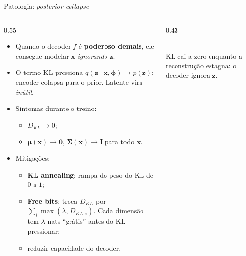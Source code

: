 \documentclass[aspectratio=169,xcolor=dvipsnames]{beamer}
\begin{document}
  \begin{frame}{Patologia: \textit{posterior collapse}}
    \begin{columns}[T]
      \begin{column}{0.55\textwidth}
        \begin{itemize}
          \item Quando o decoder $f$ é \textbf{poderoso demais}, ele
          consegue modelar $\mathbf{x}$ \emph{ignorando} $\mathbf{z}$.
          \item O termo KL pressiona $q(\mathbf{z}\mid \mathbf{x},\bm{\phi})\to p(\mathbf{z})$:
          encoder colapsa para o prior. Latente vira \emph{inútil}.
          \item Sintomas durante o treino:
          \begin{itemize}
            \item $D_{KL}\to 0$;
            \item $\boldsymbol{\mu}(\mathbf{x})\to \mathbf{0}$, $\boldsymbol{\Sigma}(\mathbf{x})\to \mathbf{I}$ para todo $\mathbf{x}$.
          \end{itemize}
          \item Mitigações:
          \begin{itemize}
            \item \textbf{KL annealing}: rampa do peso do KL de $0$ a $1$;
            \item \textbf{Free bits}: troca $D_{KL}$ por
            $\sum_i \max(\lambda,\, D_{KL,i})$. Cada dimensão tem
            $\lambda$ nats ``grátis'' antes do KL pressionar;
            \item reduzir capacidade do decoder.
          \end{itemize}
        \end{itemize}
      \end{column}
      \begin{column}{0.43\textwidth}
        \centering
        \\
        \vspace{0.2em}
        \scriptsize KL cai a zero enquanto a reconstrução estagna: o
        decoder ignora $\mathbf{z}$.
      \end{column}
    \end{columns}
  \end{frame}
\end{document}
